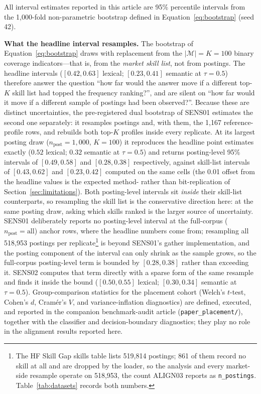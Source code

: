 \documentclass[journal]{IEEEtran}
\begin{document}
All interval estimates reported in this article are 95\% percentile intervals from the 1{,}000-fold non-parametric bootstrap defined in Equation~\ref{eq:bootstrap} (seed 42).

\textbf{What the headline interval resamples.} The bootstrap of Equation~\ref{eq:bootstrap} draws with replacement from the $|\mathcal{M}| = K = 100$ binary coverage indicators---that is, from the \emph{market skill list}, not from postings. The headline intervals ($[0.42, 0.63]$ lexical; $[0.23, 0.41]$ semantic at $\tau = 0.5$) therefore answer the question ``how far would the answer move if a different top-$K$ skill list had topped the frequency ranking?'', and are silent on ``how far would it move if a different sample of postings had been observed?''. Because these are distinct uncertainties, the pre-registered dual bootstrap of SENS01 estimates the second one separately: it resamples postings and, with them, the 1{,}167 reference-profile rows, and rebuilds both top-$K$ profiles inside every replicate. At its largest posting draw ($n_{\text{post}} = 1{,}000$, $K = 100$) it reproduces the headline point estimates exactly ($0.52$ lexical; $0.32$ semantic at $\tau = 0.5$) and returns posting-level 95\% intervals of $[0.49, 0.58]$ and $[0.28, 0.38]$ respectively, against skill-list intervals of $[0.43, 0.62]$ and $[0.23, 0.42]$ computed on the same cells (the 0.01 offset from the headline values is the expected method- rather than bit-replication of Section~\ref{sec:limitations}). Both posting-level intervals sit \emph{inside} their skill-list counterparts, so resampling the skill list is the conservative direction here: at the same posting draw, asking which skills ranked is the larger source of uncertainty. SENS01 deliberately reports no posting-level interval at the full-corpus ($n_{\text{post}} = \text{all}$) anchor rows, where the headline numbers come from; resampling all 518{,}953 postings per replicate\footnote{The HF Skill Gap skills table lists 519{,}814 postings; 861 of them record no skill at all and are dropped by the loader, so the analysis and every market-side resample operate on 518{,}953, the count ALIGN03 reports as \texttt{n\_postings}. Table~\ref{tab:datasets} records both numbers.} is beyond SENS01's gather implementation, and the posting component of the interval can only shrink as the sample grows, so the full-corpus posting-level term is bounded by $[0.28, 0.38]$ rather than exceeding it. SENS02 computes that term directly with a sparse form of the same resample and finds it inside the bound ($[0.50, 0.55]$ lexical; $[0.30, 0.34]$ semantic at $\tau = 0.5$). Group-comparison statistics for the placement cohort (Welch's $t$-test, Cohen's $d$, Cram\'er's $V$, and variance-inflation diagnostics) are defined, executed, and reported in the companion benchmark-audit article (\texttt{paper\_placement/}), together with the classifier and decision-boundary diagnostics; they play no role in the alignment results reported here.
\end{document}
